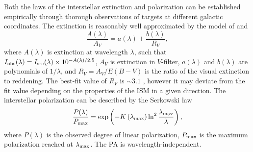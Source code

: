 Both the laws of the interstellar extinction and polarization can be established empirically through thorough observations of targets at different galactic coordinates.
The extinction is reasonably well approximated by the model of \citet{Cardelli89} and \citet{ODonnell94}
\begin{equation}
    \frac{A(\lambda)}{A_V} = a(\lambda) + \frac{b(\lambda)}{R_V},
\end{equation}
where $A(\lambda)$ is extinction at wavelength $\lambda$, such that $I_{\mathrm{obs}}(\lambda) = I_{\mathrm{src}}(\lambda) \times 10^{-A(\lambda)/2.5}$, $A_V$ is extinction in $V$-filter, $a(\lambda)$ and $b(\lambda)$ are polynomials of $1/\lambda$, and $R_V = A_V / E(B-V)$ is the ratio of the visual extinction to reddening.
The best-fit value of $R_V$ is $\sim 3.1$ \citep[based on a sample of stars, see][]{ODonnell94}, however it may deviate from the fit value depending on the properties of the \gls{ISM} in a given direction.
The interstellar polarization can be described by the Serkowski law \citep{Serkowski1962, Serkowski1973, Whittet1992}
\begin{equation}
    \label{eq:pol_serkowski}
    \frac{P(\lambda)}{P_{\mathrm{max}}} = \exp\left(-K\left(\lambda_{\mathrm{max}}\right) \ln^2\frac{\lambda_{\mathrm{max}}}{\lambda} \right),
\end{equation}
where $P(\lambda)$ is the observed degree of linear polarization, $P_{\mathrm{max}}$ is the maximum polarization reached at $\lambda_{\mathrm{max}}$.
The \gls{PA} is wavelength-independent.

